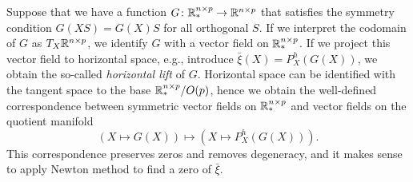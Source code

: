 Suppose that we have a function $G \colon \mathbb{R}^{n \times p}_{*} \to \mathbb{R}^{n \times p}$
that satisfies the symmetry condition $G(XS) = G(X)S$ for all orthogonal $S$.
If we interpret the codomain of $G$
as $T_X\mathbb{R}^{n \times p}$, we identify $G$ with a vector field
on $\mathbb{R}^{n \times p}_{*}$. If we project this vector field to horizontal space,
e.g., introduce $\bar{\xi}(X) = P^h_X(G(X))$, we obtain the so-called 
\textit{horizontal lift} of $G$. Horizontal space can be identified
with the tangent space to the base $\mathbb{R}^{n \times p}_{*} / O(p)$, hence
we obtain the well-defined  correspondence between symmetric vector fields
on $\mathbb{R}^{n \times p}_{*}$ and vector fields on the quotient manifold
\begin{equation}
( X \mapsto G(X) ) \mapsto (X \mapsto P^h_{X}(G(X))).
\end{equation}
This correspondence preserves zeros and removes degeneracy, and it makes sense
to apply Newton method to find a zero of $\bar{\xi}$.


